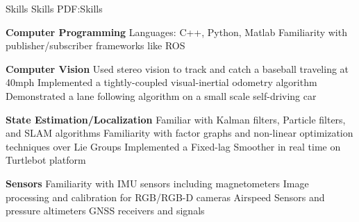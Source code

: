 \documentclass[letterpaper,MMMyyyy,nonstopmode]{simpleresumecv}
\begin{document}
\begin{Body}



\Section
{Skills}
{Skills}
{PDF:Skills}

\Entry
{\textbf{Computer Programming}}
\Gap
\BulletItem
Languages: C++, Python, Matlab
\BulletItem
Familiarity with publisher/subscriber frameworks like ROS


\Gap
\Entry
{\textbf{Computer Vision}}
\Gap
\BulletItem
Used stereo vision to track and catch a baseball traveling at  40mph
\BulletItem
Implemented a tightly-coupled visual-inertial odometry algorithm
\BulletItem
Demonstrated a lane following algorithm on a small scale self-driving car

\Gap
\Entry
{\textbf{State Estimation/Localization}}
\Gap
\BulletItem
Familiar with Kalman filters, Particle filters, and SLAM algorithms
\BulletItem
Familiarity with factor graphs and non-linear optimization techniques over Lie Groups
\BulletItem
Implemented a Fixed-lag Smoother in real time on Turtlebot platform

\Gap
\Entry
{\textbf{Sensors}}
\Gap
\BulletItem
Familiarity with IMU sensors including magnetometers
\BulletItem
Image processing and calibration for RGB/RGB-D cameras
\BulletItem
Airspeed Sensors and pressure altimeters
\BulletItem
GNSS receivers and signals



\end{Body}
\end{document}
